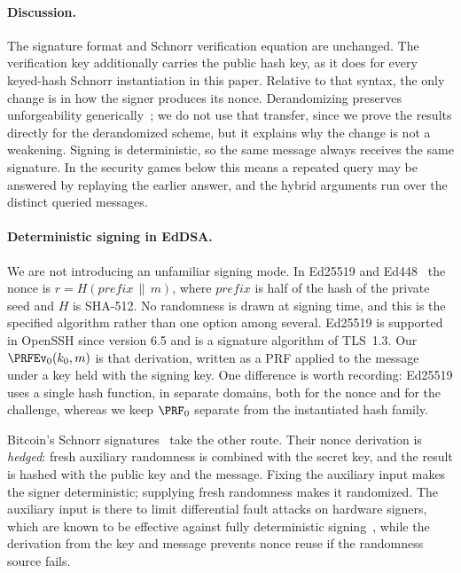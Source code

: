 \paragraph*{Discussion.} The signature format and Schnorr verification equation are unchanged. The verification key additionally carries the public hash key, as it does for every keyed-hash Schnorr instantiation in this paper. Relative to that syntax, the only change is in how the signer produces its nonce. Derandomizing preserves unforgeability generically~\cite{SAC:MNPV98}; we do not use that transfer, since we prove the results directly for the derandomized scheme, but it explains why the change is not a weakening. Signing is deterministic, so the same message always receives the same signature. In the security games below this means a repeated query may be answered by replaying the earlier answer, and the hybrid arguments run over the distinct queried messages.

\paragraph*{Deterministic signing in EdDSA.} We are not introducing an unfamiliar signing mode. In Ed25519 and Ed448~\cite{eddsa,RFC8032} the nonce is $r = H(\mathit{prefix} \,\|\, m)$, where $\mathit{prefix}$ is half of the hash of the private seed and $H$ is SHA-512. No randomness is drawn at signing time, and this is the specified algorithm rather than one option among several. Ed25519 is supported in OpenSSH since version 6.5 and is a signature algorithm of TLS~1.3. Our $\PRFEv_0(k_0,m)$ is that derivation, written as a PRF applied to the message under a key held with the signing key. One difference is worth recording: Ed25519 uses a single hash function, in separate domains, both for the nonce and for the challenge, whereas we keep $\PRF_0$ separate from the instantiated hash family.

Bitcoin's Schnorr signatures~\cite{add:BIP340} take the other route. Their nonce derivation is \emph{hedged}: fresh auxiliary randomness is combined with the secret key, and the result is hashed with the public key and the message. Fixing the auxiliary input makes the signer deterministic; supplying fresh randomness makes it randomized. The auxiliary input is there to limit differential fault attacks on hardware signers, which are known to be effective against fully deterministic signing~\cite{PSSLR18}, while the derivation from the key and message prevents nonce reuse if the randomness source fails.

